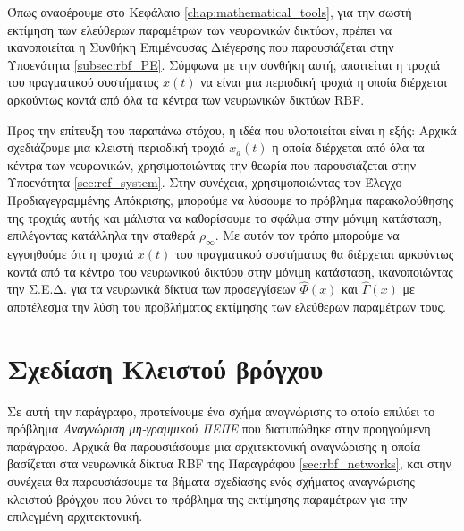 Όπως αναφέρουμε στο Κεφάλαιο \ref{chap:mathematical_tools}, για την σωστή εκτίμηση των ελεύθερων παραμέτρων των νευρωνικών δικτύων, πρέπει να ικανοποιείται η Συνθήκη Επιμένουσας Διέγερσης που παρουσιάζεται στην Υποενότητα \ref{subsec:rbf_PE}. Σύμφωνα με την συνθήκη αυτή, απαιτείται η τροχιά του πραγματικού συστήματος $x(t)$ να είναι μια περιοδική τροχιά η οποία διέρχεται αρκούντως κοντά από όλα τα κέντρα των νευρωνικών δικτύων RBF.

Προς την επίτευξη του παραπάνω στόχου, η ιδέα που υλοποιείται είναι η εξής: Αρχικά σχεδιάζουμε μια κλειστή περιοδική τροχιά $x_d(t)$ η οποία διέρχεται από όλα τα κέντρα των νευρωνικών, χρησιμοποιώντας την θεωρία που παρουσιάζεται στην Υποενότητα \ref{sec:ref_system}. Στην συνέχεια, χρησιμοποιώντας τον Έλεγχο Προδιαγεγραμμένης Απόκρισης, μπορούμε να λύσουμε το πρόβλημα παρακολούθησης της τροχιάς αυτής και μάλιστα να καθορίσουμε το σφάλμα στην μόνιμη κατάσταση, επιλέγοντας κατάλληλα την σταθερά $\rho_{\infty}$. Με αυτόν τον τρόπο μπορούμε να εγγυηθούμε ότι η τροχιά $x(t)$ του πραγματικού συστήματος θα διέρχεται αρκούντως κοντά από τα κέντρα του νευρωνικού δικτύου στην μόνιμη κατάσταση, ικανοποιώντας την Σ.Ε.Δ. για τα νευρωνικά δίκτυα των προσεγγίσεων $\hat{\Phi}(x)$ και $\hat{\Gamma}(x)$ με αποτέλεσμα την λύση του προβλήματος εκτίμησης των ελεύθερων παραμέτρων τους.

\section{Σχεδίαση Κλειστού βρόγχου}
Σε αυτή την παράγραφο, προτείνουμε ένα σχήμα αναγνώρισης το οποίο επιλύει το πρόβλημα \textit{Αναγνώριση μη-γραμμικού ΠΕΠΕ} που διατυπώθηκε στην προηγούμενη παράγραφο. Αρχικά θα παρουσιάσουμε μια αρχιτεκτονική αναγνώρισης η οποία βασίζεται στα νευρωνικά δίκτυα RBF της Παραγράφου \ref{sec:rbf_networks}, και στην συνέχεια θα παρουσιάσουμε τα βήματα σχεδίασης ενός σχήματος αναγνώρισης κλειστού βρόγχου που λύνει το πρόβλημα της εκτίμησης παραμέτρων για την επιλεγμένη αρχιτεκτονική.




